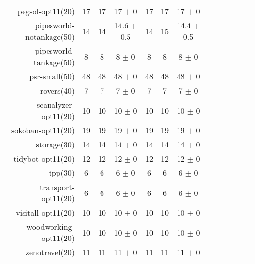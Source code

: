 \begin{center}
\begin{tabular}{|r|*{4}{ccc|}}
pegsol-opt11(20) & 17 & 17 & 17 $\pm$ 0 & 17 & 17 & 17 $\pm$ 0\\
pipesworld-notankage(50) & 14 & 14 & 14.6 $\pm$ 0.5 & 14 & 15 & 14.4 $\pm$ 0.5\\
pipesworld-tankage(50) & 8 & 8 & 8 $\pm$ 0 & 8 & 8 & 8 $\pm$ 0\\
psr-small(50) & 48 & 48 & 48 $\pm$ 0 & 48 & 48 & 48 $\pm$ 0\\
rovers(40) & 7 & 7 & 7 $\pm$ 0 & 7 & 7 & 7 $\pm$ 0\\
scanalyzer-opt11(20) & 10 & 10 & 10 $\pm$ 0 & 10 & 10 & 10 $\pm$ 0\\
sokoban-opt11(20) & 19 & 19 & 19 $\pm$ 0 & 19 & 19 & 19 $\pm$ 0\\
storage(30) & 14 & 14 & 14 $\pm$ 0 & 14 & 14 & 14 $\pm$ 0\\
tidybot-opt11(20) & 12 & 12 & 12 $\pm$ 0 & 12 & 12 & 12 $\pm$ 0\\
tpp(30) & 6 & 6 & 6 $\pm$ 0 & 6 & 6 & 6 $\pm$ 0\\
transport-opt11(20) & 6 & 6 & 6 $\pm$ 0 & 6 & 6 & 6 $\pm$ 0\\
visitall-opt11(20) & 10 & 10 & 10 $\pm$ 0 & 10 & 10 & 10 $\pm$ 0\\
woodworking-opt11(20) & 10 & 10 & 10 $\pm$ 0 & 10 & 10 & 10 $\pm$ 0\\
zenotravel(20) & 11 & 11 & 11 $\pm$ 0 & 11 & 11 & 11 $\pm$ 0\\
\end{tabular}
\end{center}
